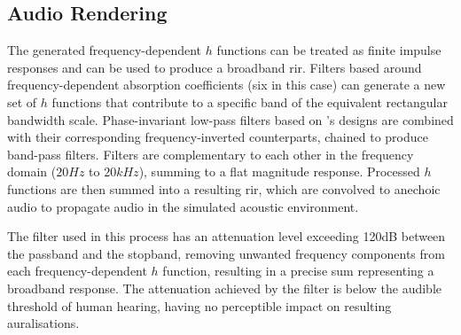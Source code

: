 \subsection{Audio Rendering}
The generated frequency-dependent $h$ functions can be treated as finite impulse responses and can be used to produce a broadband \acrshort{rir}. Filters based around frequency-dependent absorption coefficients (six in this case) can generate a new set of $h$ functions that contribute to a specific band of the equivalent rectangular bandwidth scale. Phase-invariant low-pass filters based on \citep{smith1997scientist}'s designs are combined with their corresponding frequency-inverted counterparts, chained to produce band-pass filters. Filters are complementary to each other in the frequency domain ($20Hz$ to $20kHz$), summing to a flat magnitude response. Processed $h$ functions are then summed into a resulting \acrshort{rir}, which are convolved to anechoic audio to propagate audio in the simulated acoustic environment. \par
The filter used in this process has an attenuation level exceeding 120dB between the passband and the stopband, removing unwanted frequency components from each frequency-dependent $h$ function, resulting in a precise sum representing a broadband response. The attenuation achieved by the filter is below the audible threshold of human hearing, having no perceptible impact on resulting auralisations.

